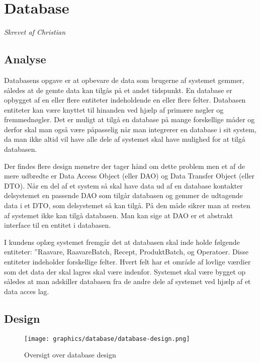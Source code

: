 \documentclass[a4paper]{article}
\newenvironment{changemargin}[2]{%
\begin{list}{}{%
\setlength{\topsep}{0pt}%
\setlength{\leftmargin}{#1}%
\setlength{\rightmargin}{#2}%
\setlength{\listparindent}{\parindent}%
\setlength{\itemindent}{\parindent}%
\setlength{\parsep}{\parskip}%
}%
\item[]}{\end{list}}
\begin{document}
\section{Database} %
\emph{Skrevet af Christian}

\subsection{Analyse} %

Databasens opgave er at opbevare de data som brugerne af systemet gemmer, således at de gemte data kan tilgås på et andet tidspunkt. En database er opbygget af en eller flere entiteter indeholdende en eller flere felter. Databasen entiteter kan være knyttet til hinanden ved hjælp af primære nøgler og fremmednøgler. Det er muligt at tilgå en database på mange forskellige måder og derfor skal man også være påpasselig når man integrerer en database i sit system, da man ikke altid vil have alle dele af systemet skal have mulighed for at tilgå databasen. 

Der findes flere design mønstre der tager hånd om dette problem men et af de mere udbredte er Data Access Object (eller DAO) og Data Transfer Object (eller DTO). Når en del af et system så skal have data ud af en database kontakter delsystemet en passende DAO som tilgår databasen og gemmer de udtagende data i et DTO, som delsystemet så kan tilgå. På den måde sikrer man at resten af systemet ikke kan tilgå databasen. Man kan sige at DAO er et abstrakt interface til en entitet i databasen.

I kundens oplæg systemet fremgår det at databasen skal inde holde følgende entiteter: ”Raavare, RaavareBatch, Recept, ProduktBatch, og Operatoer. Disse entiteter indeholder forskellige felter. Hvert felt har et område af lovlige værdier som det data der skal lagres skal være indenfor.
Systemet skal være bygget op således at man adskiller databasen fra de andre dele af systemet ved hjælp af et data acces lag.


\subsection{Design} %

\begin{figure}[H]
\begin{changemargin}{-1.3cm}{-1.3cm}
  \centering
  \texttt{[image: graphics/database/database-design.png]}
  \caption{Oversigt over database design}
\end{changemargin}
\end{figure}
\end{document}
